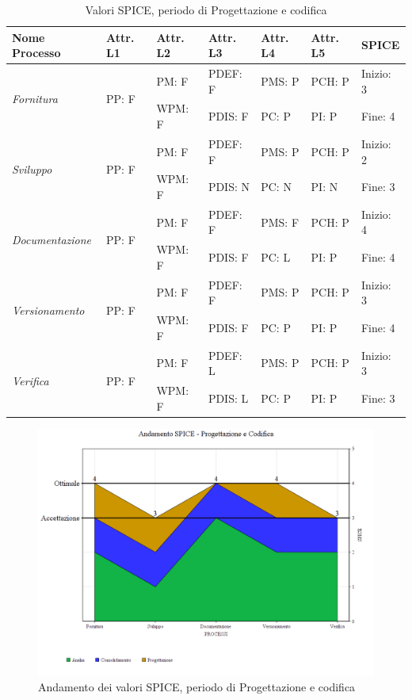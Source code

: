 \documentclass[openany,12pt,a4paper]{report}
\begin{document}
\begin{table}[h]
	\begin{center}
		\setlength\LTleft{-22mm}
		\begin{longtable}{|p{35mm}|p{20mm}|p{20mm}|p{20mm}|p{20mm}|p{20mm}|p{20mm}|}
			\hline
			\textbf{Nome Processo} & \textbf{Attr. L1} & \textbf{Attr. L2} & \textbf{Attr. L3} & \textbf{Attr. L4} & \textbf{Attr. L5} & \textbf{SPICE}\\
			\hline
			\multirow{2}{*}{\textit{Fornitura}} & \multirow{2}{*}{PP: F} & PM: F & PDEF: F & PMS: P & PCH: P & Inizio: 3\\  
			\cline{3-7}
			&          & WPM: F & PDIS: F & PC: P & PI: P & Fine: 4 \\ 
			\hline
			\multirow{2}{*}{\textit{Sviluppo}} & \multirow{2}{*}{PP: F} & PM: F & PDEF: F & PMS: P & PCH: P & Inizio: 2\\  \cline{3-7}
			&          & WPM: F & PDIS: N & PC: N & PI: N & Fine: 3\\
			\hline\multirow{2}{*}{\textit{Documentazione}} & \multirow{2}{*}{PP: F} & PM: F & PDEF: F & PMS: F & PCH: P & Inizio: 4\\  \cline{3-7}
			&          & WPM: F & PDIS: F & PC: L & PI: P & Fine: 4\\ 
			\hline\multirow{2}{*}{\textit{Versionamento}} & \multirow{2}{*}{PP: F} & PM: F & PDEF: F & PMS: P & PCH: P & Inizio: 3\\  \cline{3-7}
			&          & WPM: F & PDIS: F & PC: P & PI: P & Fine: 4\\ 
			\hline\multirow{2}{*}{\textit{Verifica}} & \multirow{2}{*}{PP: F} & PM: F & PDEF: L & PMS: P & PCH: P & Inizio: 3\\  \cline{3-7}
			&          & WPM: F & PDIS: L & PC: P & PI: P & Fine: 3\\ 
			\hline       
		\end{longtable}
	\end{center}
	\caption{Valori SPICE, periodo di Progettazione e codifica} 
\end{table}

\begin{figure}[H]
	\includegraphics[scale=0.5]{verifica-progettazione-spice}
	\centering
	\caption{Andamento dei valori SPICE, periodo di Progettazione e codifica}
\end{figure}
\end{document}
